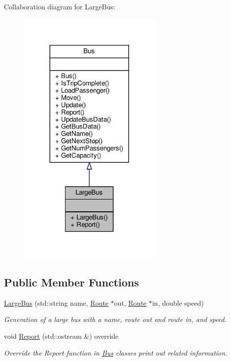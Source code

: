 Collaboration diagram for Large\+Bus\+:\nopagebreak
\begin{figure}[H]
\begin{center}
\leavevmode
\includegraphics[width=200pt]{classLargeBus__coll__graph}
\end{center}
\end{figure}
\subsection*{Public Member Functions}
\begin{DoxyCompactItemize}
\item 
\hyperlink{classLargeBus_ac8f521c3be648d23eb8b4ac97bae3a43}{Large\+Bus} (std\+::string name, \hyperlink{classRoute}{Route} $\ast$out, \hyperlink{classRoute}{Route} $\ast$in, double speed)
\begin{DoxyCompactList}\small\item\em Generation of a large bus with a name, route out and route in, and speed. \end{DoxyCompactList}\item 
void \hyperlink{classLargeBus_a4e20f9c3199c1099f653f755b618ccea}{Report} (std\+::ostream \&) override
\begin{DoxyCompactList}\small\item\em Override the Report function in \hyperlink{classBus}{Bus} classes print out related information. \end{DoxyCompactList}\end{DoxyCompactItemize}


